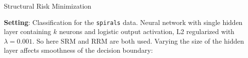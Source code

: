 \begin{frame} {Structural Risk Minimization}

\small

\textbf{Setting}: Classification for the \texttt{spirals} data.
Neural network with single hidden layer containing $k$ neurons and logistic 
output activation, L2 regularized with $\lambda = 0.001$. 
So here SRM and RRM are both used.
Varying the size of the hidden layer affects smoothness of the decision boundary:


\vfill



\end{frame}
